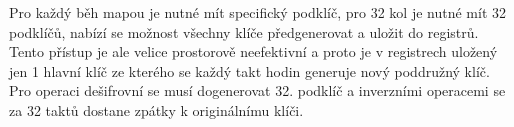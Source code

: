 Pro každý běh mapou je nutné mít specifický podklíč, pro 32 kol je nutné mít 32 podklíčů, nabízí se možnost všechny klíče předgenerovat a uložit do registrů. Tento přístup je ale velice
prostorově neefektivní a proto je v registrech uložený jen 1 hlavní klíč ze kterého se každý takt hodin generuje nový poddružný klíč. Pro operaci dešifrovní se musí dogenerovat 32. podklíč a inverzními operacemi se za 32 taktů dostane zpátky k originálnímu klíči.


%
%
%
%
